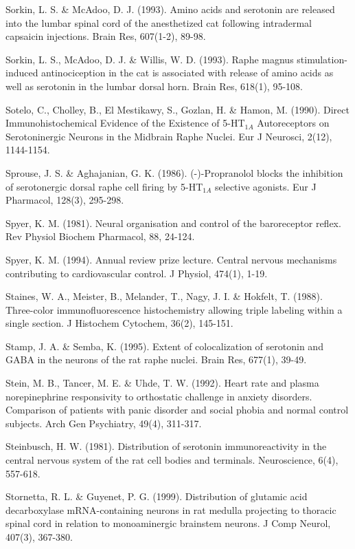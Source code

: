 \documentclass[a4paper,12pt,twoside]{report}
\begin{document}
\begin{singlespacing}
\begin{footnotesize}
Sorkin, L. S. \& McAdoo, D. J. (1993). Amino acids and serotonin are released into the lumbar spinal cord of the anesthetized cat following intradermal capsaicin injections. Brain Res, 607(1-2), 89-98.

Sorkin, L. S., McAdoo, D. J. \& Willis, W. D. (1993). Raphe magnus stimulation-induced antinociception in the cat is associated with release of amino acids as well as serotonin in the lumbar dorsal horn. Brain Res, 618(1), 95-108.

Sotelo, C., Cholley, B., El Mestikawy, S., Gozlan, H. \& Hamon, M. (1990). Direct Immunohistochemical Evidence of the Existence of 5-HT$_{1A}$ Autoreceptors on Serotoninergic Neurons in the Midbrain Raphe Nuclei. Eur J Neurosci, 2(12), 1144-1154.

Sprouse, J. S. \& Aghajanian, G. K. (1986). (-)-Propranolol blocks the inhibition of serotonergic dorsal raphe cell firing by 5-HT$_{1A}$ selective agonists. Eur J Pharmacol, 128(3), 295-298.

Spyer, K. M. (1981). Neural organisation and control of the baroreceptor reflex. Rev Physiol Biochem Pharmacol, 88, 24-124.

Spyer, K. M. (1994). Annual review prize lecture. Central nervous mechanisms contributing to cardiovascular control. J Physiol, 474(1), 1-19.

Staines, W. A., Meister, B., Melander, T., Nagy, J. I. \& Hokfelt, T. (1988). Three-color immunofluorescence histochemistry allowing triple labeling within a single section. J Histochem Cytochem, 36(2), 145-151.

Stamp, J. A. \& Semba, K. (1995). Extent of colocalization of serotonin and GABA in the neurons of the rat raphe nuclei. Brain Res, 677(1), 39-49.

Stein, M. B., Tancer, M. E. \& Uhde, T. W. (1992). Heart rate and plasma norepinephrine responsivity to orthostatic challenge in anxiety disorders. Comparison of patients with panic disorder and social phobia and normal control subjects. Arch Gen Psychiatry, 49(4), 311-317.

Steinbusch, H. W. (1981). Distribution of serotonin immunoreactivity in the central nervous system of the rat cell bodies and terminals. Neuroscience, 6(4), 557-618.

Stornetta, R. L. \& Guyenet, P. G. (1999). Distribution of glutamic acid decarboxylase mRNA-containing neurons in rat medulla projecting to thoracic spinal cord in relation to monoaminergic brainstem neurons. J Comp Neurol, 407(3), 367-380.


\end{footnotesize}
\end{singlespacing}
\end{document}
